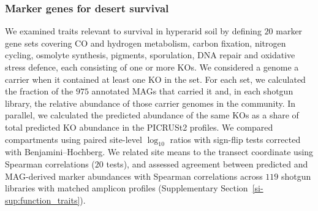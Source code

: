 \documentclass[fleqn,10pt,numbers]{olplainarticle}
\begin{document}
\subsubsection*{Marker genes for desert survival}\label{sec:function_markergenes}
We examined traits relevant to survival in hyperarid soil by defining $20$ marker gene sets covering CO and hydrogen metabolism, carbon fixation, nitrogen cycling, osmolyte synthesis, pigments, sporulation, DNA repair and oxidative stress defence, each consisting of one or more KOs. We considered a genome a carrier when it contained at least one KO in the set. For each set, we calculated the fraction of the $975$ annotated MAGs that carried it and, in each shotgun library, the relative abundance of those carrier genomes in the community. In parallel, we calculated the predicted abundance of the same KOs as a share of total predicted KO abundance in the PICRUSt2 profiles. We compared compartments using paired site-level $\log_{10}$ ratios with sign-flip tests corrected with Benjamini--Hochberg. We related site means to the transect coordinate using Spearman correlations ($20$ tests), and assessed agreement between predicted and MAG-derived marker abundances with Spearman correlations across $119$ shotgun libraries with matched amplicon profiles (Supplementary Section~\ref{si-sup:function_traits}).


\end{document}
